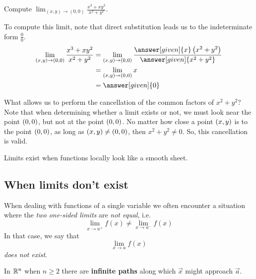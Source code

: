 \documentclass{ximera}
\begin{document}
\begin{example}
  Compute $\lim_{(x,y)\to(0,0)} \frac{x^3+xy^2}{x^2+y^2}$. 
  \begin{explanation}
   To compute this limit, note that direct substitution leads us to the indeterminate form $\frac{0}{0}$.      
    \begin{align*}
      \lim_{(x,y)\to(0,0)}\frac{x^3+xy^2}{x^2+y^2}
      &=\lim_{(x,y)\to(0,0)} \frac{\answer[given]{x}\left(x^2+y^2\right)}{\answer[given]{x^2+y^2}}\\
      &=\lim_{(x,y)\to(0,0)} x\\
      &=\answer[given]{0}
    \end{align*}
    
    What allows us to perform the cancellation of the common factors of $x^2+y^2$?  Note that when determining whether a limit exists or not, we must look near the point $\left(0,0\right)$, but not at the point $\left(0,0\right)$.  No matter how close a point  $\left(x,y\right)$ is to the point $\left(0,0\right)$, as long as  $\left(x,y\right) \neq \left(0,0\right)$, then $x^2+y^2 \neq 0$. So, this cancellation is valid.
  \end{explanation}
\end{example}



Limits exist when functions locally look like a smooth sheet.
\subsection{When limits don't exist}

When dealing with functions of a single variable we often encounter a situation where the \emph{two one-sided limits} are \emph{not equal}, i.e.
\[
\lim_{x\to a^+}f(x) \ne  \lim_{x\to a^-}f(x)
\]
In that case, we say that
\[
\lim_{x\to a}f(x) 
\]
\emph{does not exist}.



In $\mathbb R^n$ when $n\ge2$ there are \textbf{infinite paths} along which
$\vec{x}$ might approach $\vec{a}$. 
\end{document}
